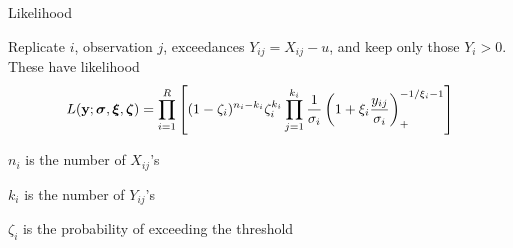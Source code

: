 \documentclass[mathserif, 11pt, t]{beamer}
\begin{document}
% 
% 
% 


\begin{frame}{Likelihood}

Replicate $i$, observation $j$, exceedances $Y_{ij} = X_{ij} - u$, and keep only those $Y_i > 0$. These have likelihood
\[ L(\mathbf{\bm{y}}; \mathbf{\bm{\sigma}}, \mathbf{\bm{\xi}}, \mathbf{\bm{\zeta}}) = \prod_{i=1}^R\left[(1-\zeta_i)^{n_i-k_i}\zeta_i^{k_i}\prod_{j=1}^{k_i}\frac{1}{\sigma_i}\left(1+\xi_i\frac{y_{ij}}{\sigma_i}\right)_+^{-1/\xi_i-1}\right] \]

$n_i$ is the number of $X_{ij}$'s

$k_i$ is the number of $Y_{ij}$'s

$\zeta_i$ is the probability of exceeding the threshold

\end{frame}
\end{document}
